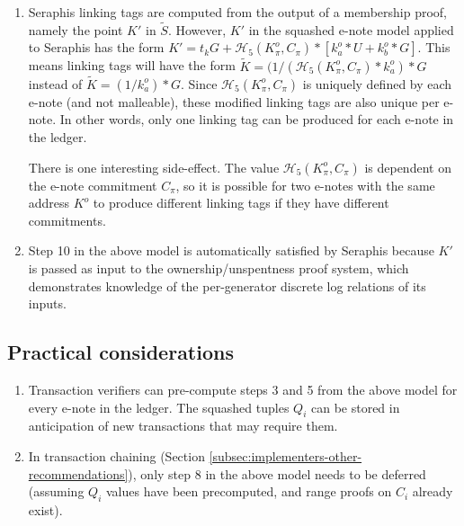 \begin{appendices}
\begin{enumerate}
\begin{enumerate}
        [[[formal proof? this is giving me a lot of trouble]]]
    \end{enumerate}

    \item Seraphis linking tags are computed from the output of a membership proof, namely the point $K'$ in $\tilde{S}$. However, $K'$ in the squashed e-note model applied to Seraphis has the form $K' = t_k G + \mathcal{H}_5(K^o_{\pi}, C_{\pi})*[k^o_a*U + k^o_b*G]$. This means linking tags will have the form $\tilde{K} = (1/(\mathcal{H}_5(K^o_{\pi}, C_{\pi})*k^o_a)*G$ instead of $\tilde{K} = (1/k^o_a)*G$. Since $\mathcal{H}_5(K^o_{\pi}, C_{\pi})$ is uniquely defined by each e-note (and not malleable), these modified linking tags are also unique per e-note. In other words, only one linking tag can be produced for each e-note in the ledger.

    There is one interesting side-effect. The value $\mathcal{H}_5(K^o_{\pi}, C_{\pi})$ is dependent on the e-note commitment $C_{\pi}$, so it is possible for two e-notes with the same address $K^o$ to produce different linking tags if they have different commitments.

    \item Step 10 in the above model is automatically satisfied by Seraphis because $K'$ is passed as input to the ownership/unspentness proof system, which demonstrates knowledge of the per-generator discrete log relations of its inputs.
\end{enumerate}


\subsection{Practical considerations}
\label{appendix:squashed-e-note-model-practical-considerations}

\begin{enumerate}
    \item Transaction verifiers can pre-compute steps 3 and 5 from the above model for every e-note in the ledger. The squashed tuples $Q_i$ can be stored in anticipation of new transactions that may require them.

    \item In transaction chaining (Section \ref{subsec:implementers-other-recommendations}), only step 8 in the above model needs to be deferred (assuming $Q_i$ values have been precomputed, and range proofs on $C_i$ already exist).
\end{enumerate}




\end{appendices}
